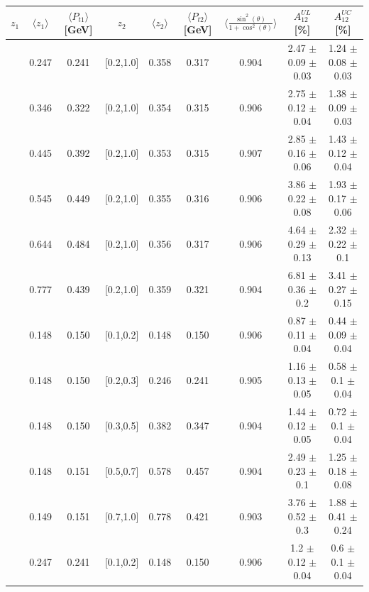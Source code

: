 \documentclass[aps,prX,preprint,groupedaddress,linenumbers]{revtex4-1}
\begin{document}
\begin{table}[H]\tiny
\centering
\begin{tabular}{|c|c|c|c|c|c|c|c|c|}
\hline
$z_1$ & $\langle  z_1 \rangle$ & $\langle  P_{t1}  \rangle$ [GeV] & $z_2$ &  $\langle  z_2 \rangle$ & $\langle  P_{t2}\rangle$  [GeV] &$\langle\frac{\sin^2(\theta)}{1+\cos^2(\theta)}\rangle$ & $A_{12}^{UL}$ [\%] &  $A_{12}^{UC}$ [\%]   \\ \hline
[0.2,0.3]	&	0.247	&	0.241	&	[0.2,1.0]	&	0.358	&	0.317	&	0.904	&2.47  $\pm$ 0.09  $\pm$ 0.03 &1.24  $\pm$ 0.08  $\pm$ 0.03 \\ \hline
[0.3,0.4]	&	0.346	&	0.322	&	[0.2,1.0]	&	0.354	&	0.315	&	0.906	&2.75  $\pm$ 0.12  $\pm$ 0.04 &1.38  $\pm$ 0.09  $\pm$ 0.03 \\ \hline
[0.4,0.5]	&	0.445	&	0.392	&	[0.2,1.0]	&	0.353	&	0.315	&	0.907	&2.85  $\pm$ 0.16  $\pm$ 0.06 &1.43  $\pm$ 0.12  $\pm$ 0.04 \\ \hline
[0.5,0.6]	&	0.545	&	0.449	&	[0.2,1.0]	&	0.355	&	0.316	&	0.906	&3.86  $\pm$ 0.22  $\pm$ 0.08 &1.93  $\pm$ 0.17  $\pm$ 0.06 \\ \hline
[0.6,0.7]	&	0.644	&	0.484	&	[0.2,1.0]	&	0.356	&	0.317	&	0.906	&4.64  $\pm$ 0.29  $\pm$ 0.13 &2.32  $\pm$ 0.22  $\pm$ 0.1  \\ \hline
[0.7,1.0]	&	0.777	&	0.439	&	[0.2,1.0]	&	0.359	&	0.321	&	0.904	&6.81  $\pm$ 0.36  $\pm$ 0.2  &3.41  $\pm$ 0.27  $\pm$ 0.15 \\ \hline
\hline
[0.1,0.2]	&	0.148	&	0.150	&	[0.1,0.2]	&	0.148	&	0.150	&	0.906	&0.87  $\pm$ 0.11  $\pm$ 0.04   &	0.44  $\pm$ 0.09  $\pm$ 0.04  \\ \hline
[0.1,0.2]	&	0.148	&	0.150	&	[0.2,0.3]	&	0.246	&	0.241	&	0.905	&1.16  $\pm$ 0.13  $\pm$ 0.05   &	0.58  $\pm$ 0.1  $\pm$ 0.04   \\ \hline
[0.1,0.2]	&	0.148	&	0.150	&	[0.3,0.5]	&	0.382	&	0.347	&	0.904	&1.44  $\pm$ 0.12  $\pm$ 0.05   &	0.72  $\pm$ 0.1  $\pm$ 0.04   \\ \hline
[0.1,0.2]	&	0.148	&	0.151	&	[0.5,0.7]	&	0.578	&	0.457	&	0.904	&2.49  $\pm$ 0.23  $\pm$ 0.1    &	1.25  $\pm$ 0.18  $\pm$ 0.08  \\ \hline
[0.1,0.2]	&	0.149	&	0.151	&	[0.7,1.0]	&	0.778	&	0.421	&	0.903	&3.76  $\pm$ 0.52  $\pm$ 0.3    &	1.88  $\pm$ 0.41  $\pm$ 0.24  \\ \hline
\hline
[0.2,0.3]	&	0.247	&	0.241	&	[0.1,0.2]	&	0.148	&	0.150	&	0.906	&1.2  $\pm$ 0.12  $\pm$ 0.04    &	0.6  $\pm$ 0.1  $\pm$ 0.04    \\ \hline

\end{tabular}
\end{table}
\end{document}
